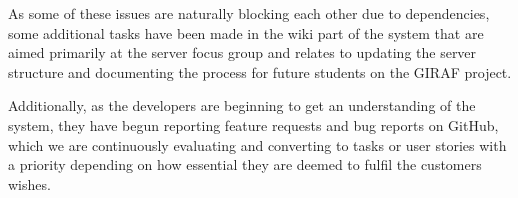 As some of these issues are naturally blocking each other due to dependencies, some additional tasks have been made in the wiki part of the system that are aimed primarily at the server focus group and relates to updating the server structure and documenting the process for future students on the GIRAF project.

Additionally, as the developers are beginning to get an understanding of the system, they have begun reporting feature requests and bug reports on GitHub, which we are continuously evaluating and converting to tasks or user stories with a priority depending on how essential they are deemed to fulfil the customers wishes.
